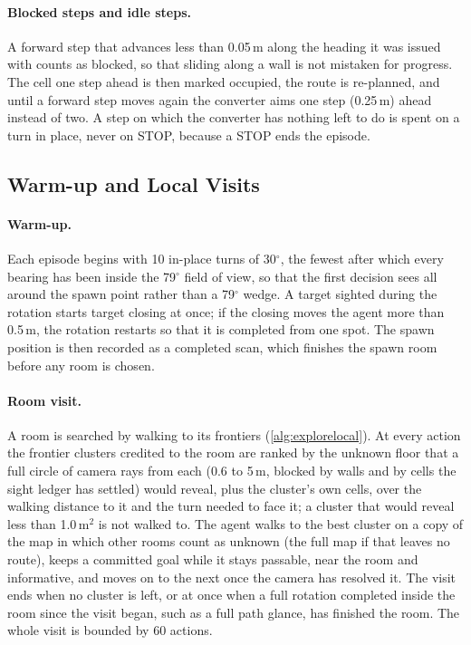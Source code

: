 \documentclass[10pt]{article}
\begin{document}
\paragraph{Blocked steps and idle steps.}
A forward step that advances less than 0.05\,m along the heading it was issued with counts as blocked, so that sliding
along a wall is not mistaken for progress. The cell one step ahead is then marked occupied, the route is re-planned,
and until a forward step moves again the converter aims one step (0.25\,m) ahead instead of two. A step on which the
converter has nothing left to do is spent on a turn in place, never on STOP, because a STOP ends the episode.

\subsection{Warm-up and Local Visits}
\label{sec:execution-local}

\paragraph{Warm-up.}
Each episode begins with 10 in-place turns of 30$^\circ$, the fewest after which every bearing has been inside the
79$^\circ$ field of view, so that the first decision sees all
around the spawn point rather than a 79$^\circ$ wedge. A target sighted during the rotation starts target closing at
once; if the closing moves the agent more than 0.5\,m, the rotation restarts so that it is completed from one spot.
The spawn position is then recorded as a completed scan, which finishes the spawn room before any room is chosen.

\paragraph{Room visit.}
A room is searched by walking to its frontiers (\cref{alg:explorelocal}). At every action the frontier clusters
credited to the room are ranked by the unknown floor that a full circle of camera rays from each (0.6 to 5\,m, blocked
by walls and by cells the sight ledger has settled) would reveal, plus the cluster's own cells, over the walking
distance to it and the turn needed to face it; a cluster that would reveal less than 1.0\,m$^2$ is not walked to. The
agent walks to the best cluster on a copy of the map in which other rooms count as unknown (the full map if that
leaves no route), keeps a committed goal while it stays passable, near the room and informative, and moves on to the
next once the camera has resolved it. The visit ends when no cluster is left, or at once when a full rotation
completed inside the room since the visit began, such as a full path glance, has finished the room. The whole visit is
bounded by 60 actions.
\end{document}
